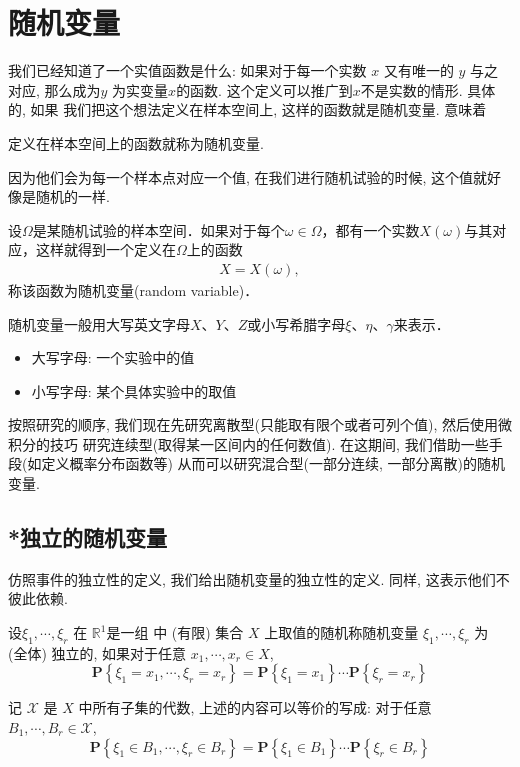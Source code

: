 \section{随机变量}

我们已经知道了一个实值函数是什么: 如果对于每一个实数 $x$ 又有唯一的 $y$ 与之对应,
那么成为$y$ 为实变量$x$的函数. 这个定义可以推广到$x$不是实数的情形. 具体的, 如果
我们把这个想法定义在样本空间上, 这样的函数就是随机变量. 意味着

\begin{definition*}
    定义在样本空间上的函数就称为随机变量.
\end{definition*}

因为他们会为每一个样本点对应一个值, 在我们进行随机试验的时候, 这个值就好像是随机的一样.

\begin{definition}[随机变量]
    设$\Omega$是某随机试验的样本空间．如果对于每个$\omega\in\Omega$，都有一个实数$X(\omega)$与其对应，这样就得到一个定义在$\Omega$上的函数
    \begin{align*}
        X=X(\omega),
    \end{align*}
    称该函数为随机变量(random variable)．
\end{definition}
随机变量一般用大写英文字母$X$、$Y$、$Z$或小写希腊字母$\xi$、$\eta$、$\gamma$来表示．
\begin{itemize}
    \item 大写字母: 一个实验中的值
    \item 小写字母: 某个具体实验中的取值
\end{itemize}

按照研究的顺序, 我们现在先研究离散型(只能取有限个或者可列个值), 然后使用微积分的技巧
研究连续型(取得某一区间内的任何数值). 在这期间, 我们借助一些手段(如定义概率分布函数等)
从而可以研究混合型(一部分连续, 一部分离散)的随机变量.

\subsection{*独立的随机变量}

仿照事件的独立性的定义, 我们给出随机变量的独立性的定义. 同样, 这表示他们不彼此依赖. 

\begin{definition}
    设$\xi_1, \cdots, \xi_r$ 在 $\mathbb{R}^1$是一组  中 (有限) 集合 $X$ 上取值的随机称随机变量 $\xi_1, \cdots, \xi_r$ 为 (全体) 独立的, 如果对于任意 $x_1, \cdots, x_r \in X$,
$$
\mathbf{P}\left\{\xi_1=x_1, \cdots, \xi_r=x_r\right\}=\mathbf{P}\left\{\xi_1=x_1\right\} \cdots \mathbf{P}\left\{\xi_r=x_r\right\}
$$
\end{definition}

\begin{shaded}
    记 $\mathscr{X}$ 是 $X$ 中所有子集的代数, 上述的内容可以等价的写成: 对于任意 $B_1, \cdots, B_r \in \mathscr{X}$,
    $$
    \mathbf{P}\left\{\xi_1 \in B_1, \cdots, \xi_r \in B_r\right\}=\mathbf{P}\left\{\xi_1 \in B_1\right\} \cdots \mathbf{P}\left\{\xi_r \in B_r\right\}
    $$
\end{shaded}